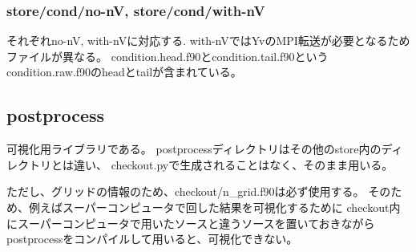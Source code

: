 \documentclass{jsarticle}
\begin{document}
\subsubsection{store/cond/no-nV, store/cond/with-nV}
それぞれno-nV, with-nVに対応する. with-nVではYvのMPI転送が必要となるためファイルが異なる。
condition.head.f90とcondition.tail.f90というcondition.raw.f90のheadとtailが含まれている。
\subsection{postprocess}%
可視化用ライブラリである。
postprocessディレクトリはその他のstore内のディレクトリとは違い、
checkout.pyで生成されることはなく、そのまま用いる。

ただし、グリッドの情報のため、checkout/n\_grid.f90は必ず使用する。
そのため、例えばスーパーコンピュータで回した結果を可視化するために
checkout内にスーパーコンピュータで用いたソースと違うソースを置いておきながら
postprocessをコンパイルして用いると、可視化できない。
\end{document}
